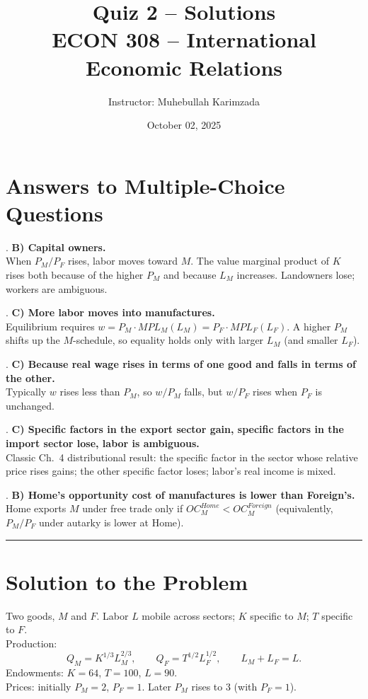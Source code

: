 \documentclass[12pt]{article}
\title{Quiz 2 -- Solutions\\ \vspace{8pt} \Large ECON 308 -- International Economic Relations}
\author{Instructor: Muhebullah Karimzada}
\date{October 02,  2025}
\begin{document}
\maketitle

\section*{Answers to Multiple-Choice Questions}

. \textbf{B) Capital owners.} \\
When $P_M/P_F$ rises, labor moves toward $M$. The value marginal product of $K$ rises both because of the higher $P_M$ and because $L_M$ increases. Landowners lose; workers are ambiguous.

\bigskip

. \textbf{C) More labor moves into manufactures.} \\
Equilibrium requires $w=P_M \cdot MPL_M(L_M)=P_F \cdot MPL_F(L_F)$. A higher $P_M$ shifts up the $M$-schedule, so equality holds only with larger $L_M$ (and smaller $L_F$).

\bigskip

. \textbf{C) Because real wage rises in terms of one good and falls in terms of the other.} \\
Typically $w$ rises less than $P_M$, so $w/P_M$ falls, but $w/P_F$ rises when $P_F$ is unchanged.

\bigskip

. \textbf{C) Specific factors in the export sector gain, specific factors in the import sector lose, labor is ambiguous.} \\
Classic Ch.~4 distributional result: the specific factor in the sector whose relative price rises gains; the other specific factor loses; labor’s real income is mixed.

\bigskip

. \textbf{B) Home’s opportunity cost of manufactures is lower than Foreign’s.} \\
Home exports $M$ under free trade only if $OC_M^{Home}<OC_M^{Foreign}$ (equivalently, $P_M/P_F$ under autarky is lower at Home).

\bigskip
\hrule
\bigskip

\section*{Solution to the Problem}


Two goods, $M$ and $F$. Labor $L$ mobile across sectors; $K$ specific to $M$; $T$ specific to $F$. \\
Production:
\[
Q_M = K^{1/3} L_M^{2/3}, 
\qquad 
Q_F = T^{1/2} L_F^{1/2}, 
\qquad 
L_M+L_F=L.
\]
Endowments: $K=64$, $T=100$, $L=90$. \\
Prices: initially $P_M=2$, $P_F=1$. Later $P_M$ rises to $3$ (with $P_F=1$).
\end{document}
